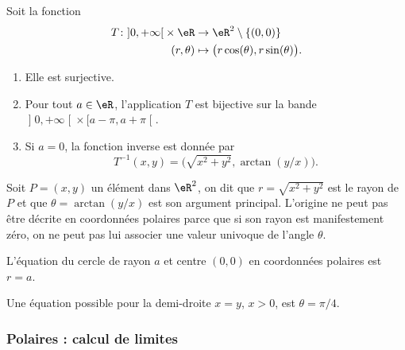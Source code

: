 \begin{proposition}     \label{PROPooFLUAooDsyMXO}
	Soit la fonction
	\begin{equation}
		\begin{aligned}
			T\colon \mathopen] 0 , +\infty \mathclose[\times \eR & \to \eR^2\setminus\{(0,0)\}                      \\
			(r,\theta)                                           & \mapsto \big( r\cos(\theta),r\sin(\theta) \big).
		\end{aligned}
	\end{equation}
	\begin{enumerate}
		\item
		      Elle est surjective.
		\item
		      Pour tout \( a\in \eR\), l'application \( T\) est bijective sur la bande \( \mathopen] 0 , +\infty \mathclose[\times \mathopen[ a-\pi , a+\pi \mathclose[\).
		\item
		      Si \( a=0\), la fonction inverse est donnée par
		      \begin{equation}
			      T^{-1}(x,y)=\big( \sqrt{ x^2+y^2 },\arctan(y/x) \big).
		      \end{equation}
	\end{enumerate}
\end{proposition}

Soit \( P=(x,y)\) un élément dans \( \eR^2\), on dit que \( r=\sqrt{x^2+y^2}\) est le rayon de \( P\) et que \( \theta=\arctan (y/x) \) est son argument principal. L'origine ne peut pas être décrite en coordonnées polaires parce que si son rayon est manifestement zéro, on ne peut pas lui associer une valeur univoque de l'angle \( \theta\).

\begin{example}
	L'équation du cercle de rayon \( a\) et centre \( (0, 0)\) en coordonnées polaires est \( r=a\).
\end{example}

\begin{example}
	Une équation possible pour la demi-droite \( x=y\), \( x>0\),  est \( \theta=\pi/4\).
\end{example}


\subsubsection{Polaires : calcul de limites}

